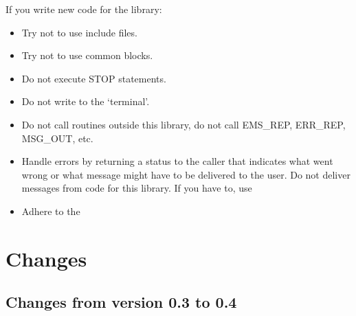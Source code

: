    If you write new code for the library:
\begin{itemize}
\item Try not to use include files.
\item Try not to use common blocks.
\item Do not execute STOP statements.
\item Do not write to the `terminal'.
\item Do not call routines outside this library, do not call EMS\_REP,
   ERR\_REP, MSG\_OUT, etc.
\item Handle errors by returning a status to the caller that indicates
   what went wrong or what message might have to be delivered to the
   user. Do not deliver messages from code for this library. If you have
   to, use
\item Adhere to the
\end{itemize}

\section{Changes}

\subsection{Changes from version 0.3 to 0.4}

